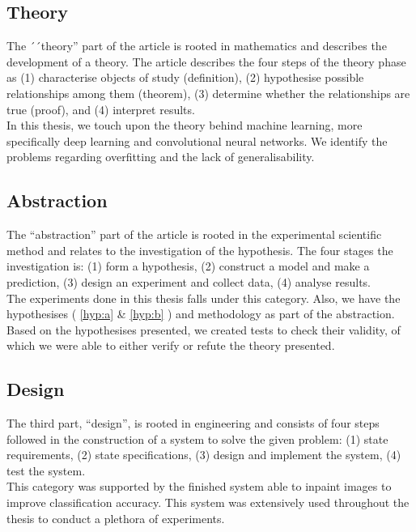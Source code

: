 \subsection{Theory}
The ´´theory'' part of the article is rooted in mathematics and describes the development of a theory. The article describes the four steps of the theory phase as (1) characterise objects of study (definition), (2) hypothesise
possible relationships among them (theorem), (3) determine whether the
relationships are true (proof), and (4) interpret results.\\

In this thesis, we touch upon the theory behind machine learning, more specifically deep learning and convolutional neural networks. We identify the problems regarding overfitting and the lack of generalisability.



\subsection{Abstraction}
The ``abstraction'' part of the article is rooted in the experimental scientific method and relates to the investigation of the hypothesis. The four stages the investigation is: (1) form a hypothesis, (2) construct a model and make a prediction, (3) design an experiment and collect data, (4) analyse results. \\

The experiments done in this thesis falls under this category. Also, we have the hypothesises ( \ref{hyp:a} \& \ref{hyp:b} ) and methodology as part of the abstraction. Based on the hypothesises presented, we created tests to check their validity, of which we were able to either verify or refute the theory presented.



\subsection{Design}
The third part, ``design'', is rooted in engineering
and consists of four steps followed in the construction
of a system to solve the given problem: (1) state requirements, (2) state specifications, (3) design and implement the system, (4) test the system. \\

This category was supported by the finished system able to inpaint images to improve classification accuracy. This system was extensively used throughout the thesis to conduct a plethora of experiments.



